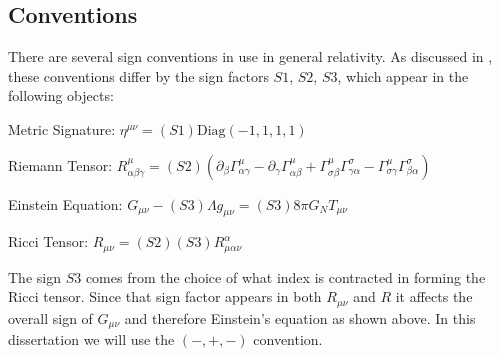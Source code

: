 \subsection{Conventions}\label{app:conventions}
There are several sign conventions in use in general relativity.  As discussed in \cite{hobson}, these conventions differ by the sign factors $S1$, $S2$, $S3$, which appear in the following objects:
\vspace{3mm}

Metric Signature: $\eta^{\mu\nu}=(S1)\text{Diag}(-1,1,1,1)$
\vspace{3mm}

Riemann Tensor: $R^\mu_{\alpha\beta\gamma}=(S2)(\partial_{\beta}\Gamma^\mu_{\alpha\gamma}-\partial_{\gamma}\Gamma^\mu_{\alpha\beta}+\Gamma^\mu_{\sigma\beta}\Gamma^\sigma_{\gamma\alpha}-\Gamma^\mu_{\sigma\gamma}\Gamma^\sigma_{\beta\alpha})$
\vspace{3mm}

Einstein Equation: $G_{\mu\nu}-(S3)\Lambda g_{\mu\nu}=(S3)8\pi G_NT_{\mu\nu}$
\vspace{3mm}

Ricci Tensor: $R_{\mu\nu}=(S2)(S3)R^\alpha_{\mu\alpha\nu}$
\vspace{3mm}

The sign $S3$ comes from the choice of what index is contracted in forming the Ricci tensor.  Since that sign factor appears in both $R_{\mu\nu}$ and $R$ it affects the overall sign of $G_{\mu\nu}$ and therefore Einstein's equation as shown above. In this dissertation we will use the $(-,+,-)$ convention.



